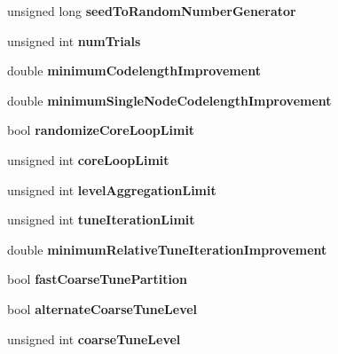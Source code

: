 \begin{DoxyCompactItemize}
\mbox{\label{structConfig_a16c9ed3fa97f886a241d510c5cf0c47e}} 
unsigned long {\bfseries seed\+To\+Random\+Number\+Generator}
\item 
\mbox{\label{structConfig_a9691df8a91f26c99b7524565c7624c02}} 
unsigned int {\bfseries num\+Trials}
\item 
\mbox{\label{structConfig_afdd972f78a882712c899d9c34d4344e4}} 
double {\bfseries minimum\+Codelength\+Improvement}
\item 
\mbox{\label{structConfig_ad912ea56c9f032fae37d7aadb63262fa}} 
double {\bfseries minimum\+Single\+Node\+Codelength\+Improvement}
\item 
\mbox{\label{structConfig_ab386a4804eabe4f2b5b83b62bfdd717a}} 
bool {\bfseries randomize\+Core\+Loop\+Limit}
\item 
\mbox{\label{structConfig_af7cbc118fc40de76dfdf3c79266e4ec7}} 
unsigned int {\bfseries core\+Loop\+Limit}
\item 
\mbox{\label{structConfig_aac4024ba49e3f4d5cd61aefe3bcb3ddf}} 
unsigned int {\bfseries level\+Aggregation\+Limit}
\item 
\mbox{\label{structConfig_a8381d9038bbda7d5d93c465823f44597}} 
unsigned int {\bfseries tune\+Iteration\+Limit}
\item 
\mbox{\label{structConfig_a80b22eea347113fabd8543c0fcd90dfa}} 
double {\bfseries minimum\+Relative\+Tune\+Iteration\+Improvement}
\item 
\mbox{\label{structConfig_a3511ab93344c3ec9d5ca7c26b3d2f8b4}} 
bool {\bfseries fast\+Coarse\+Tune\+Partition}
\item 
\mbox{\label{structConfig_a32dce6581d8a7e53c7436e4eb6eb4251}} 
bool {\bfseries alternate\+Coarse\+Tune\+Level}
\item 
\mbox{\label{structConfig_a7bb0e3f525e720b8b8b3caa4db42ab00}} 
unsigned int {\bfseries coarse\+Tune\+Level}

\end{DoxyCompactItemize}
